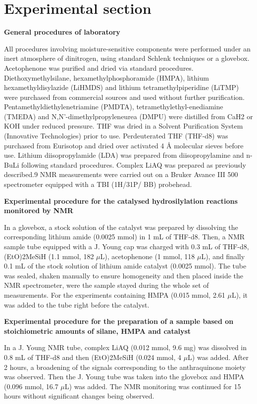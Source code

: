 \documentclass[journal=jacsat,manuscript=article]{achemso}
\begin{document}
	\section{Experimental section}
	{\bf General procedures of laboratory}
	
	All procedures involving moisture-sensitive components were	performed under an inert atmosphere of dinitrogen, using standard Schlenk techniques or a glovebox. Acetophenone was purified and dried via standard procedures.  Diethoxymethylsilane, hexamethylphosphoramide (HMPA), lithium hexamethyldisylazide (LiHMDS) and lithium tetramethylpiperidine (LiTMP) were purchased from commercial sources and used without further purification. Pentamethyldiethylenetriamine (PMDTA), tetramethylethyl-enediamine (TMEDA) and N,N'-dimethylpropyleneurea (DMPU) were distilled from CaH2 or KOH under reduced pressure. THF was dried in a Solvent Purification System (Innovative Technologies) prior to use. Perdeuterated THF (THF-d8) was purchased from Eurisotop and dried over activated 4 \si{\angstrom} molecular sieves before use. Lithium diisopropylamide (LDA) was prepared from diisopropylamine and n-BuLi
	following standard procedures. Complex LiAQ was prepared as previously described.9 NMR measurements were carried out on
	a Bruker Avance III 500 spectrometer equipped with a TBI (1H/31P/ BB) probehead.
	
	{\bf Experimental procedure for the catalysed hydrosilylation
	reactions monitored by NMR}

	In a glovebox, a stock solution of the catalyst was prepared by	dissolving the corresponding lithium amide (0.0025 mmol) in 1 mL of THF-d8. Then, a NMR sample tube equipped with a J. Young cap was charged with 0.3 mL of THF-d8, (EtO)2MeSiH
	(1.1 mmol, 182 $\mu$L), acetophenone (1 mmol, 118 $\mu$L), and	finally 0.1 mL of the stock solution of lithium amide catalyst (0.0025 mmol). The tube was sealed, shaken manually to	ensure homogeneity and then placed inside the NMR spectrometer, were the sample stayed during the whole set of measurements. For the experiments containing HMPA (0.015 mmol, 2.61 $\mu$L), it was added to the tube right before the catalyst.
	
	{\bf Experimental procedure for the preparation of a sample based on stoichiometric amounts of silane, HMPA and catalyst}
	
	In a J. Young NMR tube, complex LiAQ (0.012 mmol, 9.6 mg) was dissolved in 0.8 mL of THF-d8 and then (EtO)2MeSiH (0.024 mmol, 4 $\mu$L) was added. After 2 hours, a broadening of the signals corresponding to the anthraquinone moiety was
	observed. Then the J. Young tube was taken into the glovebox and HMPA (0.096 mmol, 16.7 $\mu$L) was added. The NMR monitoring was continued for 15 hours without significant changes being observed.
	
\end{document}
